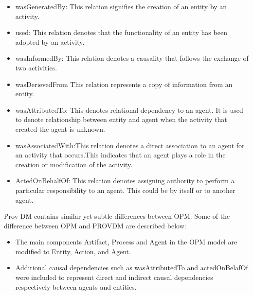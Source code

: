 \begin{itemize}
\item wasGeneratedBy: This relation signifies the creation of an entity by an activity. 

\item used: This relation denotes that the functionality of an entity has been adopted by an activity.

\item wasInformedBy: This relation denotes a causality that follows the exchange of two activities.

\item wasDerievedFrom This relation represents a copy of information from an entity. 

\item wasAttributedTo: This denotes relational dependency to an agent. It is used to denote relationship between entity and agent when the activity that created the agent is unknown.

\item wasAssociatedWith:This relation denotes a direct association to an agent for an activity that occurs.This indicates that an agent plays a role in the creation or modification of the activity.

\item ActedOnBehalfOf: This relation denotes assigning authority to perform a particular responsibility to an agent. This could be by itself or to another agent.



\end{itemize}

Prov-DM contains similar yet subtle differences between OPM. Some of the difference between OPM and PROV\-DM are described below:

\begin{itemize}

\item The main components Artifact, Process and Agent in the OPM model are modified to Entity, Action, and Agent. 

\item Additional causal dependencies such as wasAttributedTo and actedOnBelafOf were included to represent direct and indirect causal dependencies respectively between agents and entities.

\end{itemize}


